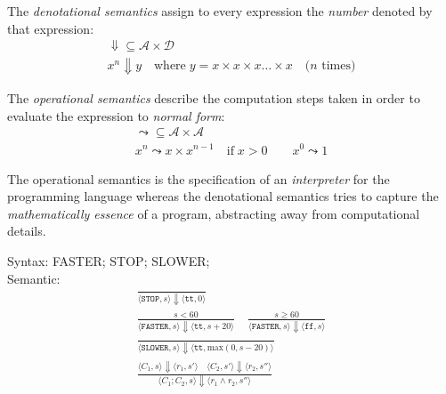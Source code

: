 \documentclass{article}
\begin{document}

\pptToc


\plush{}


\plush{}


The \emph{denotational semantics} assign to every expression the \emph{number} denoted by that expression:
\begin{gather*}
\bm{\Downarrow} \subseteq \mathcal{A} \times \mathcal{D} \\
x^n \bm{\Downarrow} y \quad\text{where}\; y = x \times x \times x \dots \times x \quad\text{($n$ times)}
\end{gather*}

The \emph{operational semantics} describe the computation steps taken in order to evaluate the expression to \emph{normal form}:
\begin{gather*}
\bm{\leadsto} \subseteq \mathcal{A} \times \mathcal{A} \\
x^n \bm{\leadsto} x \times x^{n-1} \quad\text{if}\; x > 0 \quad\quad x^0 \bm{\leadsto} 1
\end{gather*}

The operational semantics is the specification of an \emph{interpreter} for the programming language whereas the denotational semantics tries to capture the \emph{mathematically essence} of a program, abstracting away from computational details.

\plush{}


Syntax: {\ttfamily FASTER; STOP; SLOWER;}\\
Semantic:
\begin{gather*}
\frac
  {}
  {\langle \texttt{STOP}, s \rangle \Downarrow \langle \texttt{tt}, 0 \rangle }
\\[24pt]
\frac
  { s < 60 }
  {\langle \texttt{FASTER}, s \rangle \Downarrow \langle \texttt{tt}, s + 20 \rangle }
\quad
\frac
  { s \geq 60 }
  {\langle \texttt{FASTER}, s \rangle \Downarrow \langle \texttt{ff}, s \rangle }
\\[24pt]
\frac
  {}
  {\langle \texttt{SLOWER}, s \rangle \Downarrow \langle \texttt{tt}, \text{max}(0, s - 20) \rangle }
\\[24pt]
\frac
  {\langle C_1, s \rangle \Downarrow \langle r_1, s' \rangle \quad \langle C_2, s' \rangle \Downarrow \langle r_2, s'' \rangle }
  {\langle C_1 ; C_2, s \rangle \Downarrow \langle r_1 \wedge r_2, s'' \rangle }
\end{gather*}
\plush{}
\end{document}
